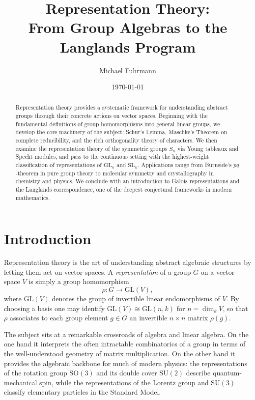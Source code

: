 \documentclass[12pt,a4paper]{amsart}
\title{Representation Theory:\\
From Group Algebras to the Langlands Program}
\author{Michael Fuhrmann}
\date{\today}
\theoremstyle{definition}
\begin{document}
\begin{abstract}
Representation theory provides a systematic framework for understanding abstract
groups through their concrete actions on vector spaces.  Beginning with the
fundamental definitions of group homomorphisms into general linear groups, we
develop the core machinery of the subject: Schur's Lemma, Maschke's Theorem on
complete reducibility, and the rich orthogonality theory of characters.  We then
examine the representation theory of the symmetric groups $S_n$ via Young tableaux
and Specht modules, and pass to the continuous setting with the highest-weight
classification of representations of $\mathrm{GL}_n$ and $\mathrm{SL}_n$.
Applications range from Burnside's $pq$-theorem in pure group theory to molecular
symmetry and crystallography in chemistry and physics.  We conclude with an
introduction to Galois representations and the Langlands correspondence, one of
the deepest conjectural frameworks in modern mathematics.
\end{abstract}

\maketitle

\tableofcontents

\section{Introduction}

Representation theory is the art of understanding abstract algebraic structures
by letting them act on vector spaces.  A \emph{representation} of a group $G$ on
a vector space $V$ is simply a group homomorphism
\[
    \rho \colon G \longrightarrow \mathrm{GL}(V),
\]
where $\mathrm{GL}(V)$ denotes the group of invertible linear endomorphisms of
$V$.  By choosing a basis one may identify $\mathrm{GL}(V) \cong \mathrm{GL}(n,k)$
for $n = \dim_k V$, so that $\rho$ associates to each group element $g \in G$ an
invertible $n \times n$ matrix $\rho(g)$.

The subject sits at a remarkable crossroads of algebra and linear algebra.
On the one hand it interprets the often intractable combinatorics of a group in
terms of the well-understood geometry of matrix multiplication.  On the other hand
it provides the algebraic backbone for much of modern physics: the representations
of the rotation group $\mathrm{SO}(3)$ and its double cover $\mathrm{SU}(2)$
describe quantum-mechanical spin, while the representations of the Lorentz group
and $\mathrm{SU}(3)$ classify elementary particles in the Standard Model.
\end{document}
